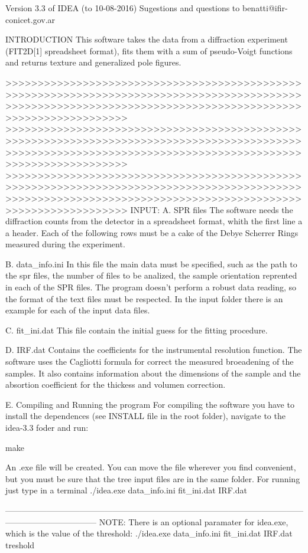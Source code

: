 Version 3.3 of IDEA (to 10-08-2016)
Sugestions and questions to benatti@ifir-conicet.gov.ar

INTRODUCTION
This software takes the data from a diffraction experiment (FIT2D[1] spreadsheet format), fits them with a sum of pseudo-Voigt functions and returns texture and 
generalized pole figures.

>>>>>>>>>>>>>>>>>>>>>>>>>>>>>>>>>>>>>>>>>>>>>>>>>>>>>>>>>>>>>>>>>>>>>>>>>>>>>>>>>>>>>>>>>>>>>>>>>>>>>>>>>>>>>>>>>>>>>>>>>>>>>>>>>>>>>>>>>>>>>>>>>>>>>>>>>>>>>
>>>>>>>>>>>>>>>>>>>>>>>>>>>>>>>>>>>>>>>>>>>>>>>>>>>>>>>>>>>>>>>>>>>>>>>>>>>>>>>>>>>>>>>>>>>>>>>>>>>>>>>>>>>>>>>>>>>>>>>>>>>>>>>>>>>>>>>>>>>>>>>>>>>>>>>>>>>>>
>>>>>>>>>>>>>>>>>>>>>>>>>>>>>>>>>>>>>>>>>>>>>>>>>>>>>>>>>>>>>>>>>>>>>>>>>>>>>>>>>>>>>>>>>>>>>>>>>>>>>>>>>>>>>>>>>>>>>>>>>>>>>>>>>>>>>>>>>>>>>>>>>>>>>>>>>>>>>
INPUT:
A. SPR files
The software needs the diffraction counts from the detector in a spreadsheet format, whith the first line a a header. Each of the following rows must be
a cake of the Debye Scherrer Rings measured during the experiment.

B. data_info.ini
In this file the main data must be specified, such as the path to the spr files, the number of files to be analized, the sample orientation reprented in each
of the SPR files. The program doesn't perform a robust data reading, so the format of the text files must be respected. In the input folder there is an example
for each of the input data files.

C. fit_ini.dat
This file contain the initial guess for the fitting procedure.

D. IRF.dat
Contains the coefficients for the instrumental resolution function. The software uses the Cagliotti formula for correct the measured broeadening of the samples.
It also contains information about the dimensions of the sample and the absortion coefficient for the thickess and volumen correction.

E. Compiling and Running the program
For compiling the software you have to install the dependences (see INSTALL file in the root folder), navigate to the idea-3.3 foder and run:

make

An .exe file will be created. You can move the file wherever you find convenient, but you must be sure that the tree input files are in the same folder. For
running just type in a terminal
./idea.exe data_info.ini fit_ini.dat IRF.dat


---------------------------------------------------------------------------------------------------------------------------------------------
NOTE: There is an optional paramater for idea.exe, which is the value of the threshold:
./idea.exe data_info.ini fit_ini.dat IRF.dat treshold

